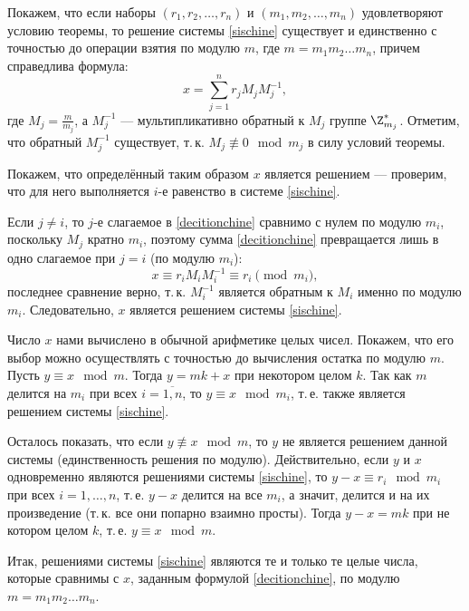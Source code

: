 \begin{enumerate}
Покажем, что если наборы $(r_{1},r_{2},\dots ,r_{n})$ и $(m_{1},m_{2},\dots ,m_{n})$ удовлетворяют условию теоремы, то решение системы \eqref{sischine} существует и единственно с точностью до операции взятия по модулю $m$, где $m=m_1m_2\dots m_n$, причем справедлива формула:
\begin{equation}\label{decitionchine}
x=\sum _{{j=1}}^{n}r_{j}M_{j}M_{j}^{{-1}},
\end{equation}
где $M_{j}=\frac m{m_{j}}$, а $M_{j}^{{-1}}$ --- мультипликативно обратный к $M_{j}$ группе $\Z_{m_j}^*$. Отметим, что обратный $M_j^{-1}$ существует, т.\,к. $M_j\not\equiv 0\mod m_j$ в силу условий теоремы.

Покажем, что определённый таким образом $x$ является решением --- проверим, что для него выполняется $i$-е равенство в системе \eqref{sischine}.

Если $j\ne i$, то $j$-е слагаемое в \eqref{decitionchine} сравнимо с нулем по модулю $m_i$, поскольку $M_j$ кратно $m_i$, поэтому сумма \eqref{decitionchine} превращается лишь в одно слагаемое при $j=i$ (по модулю $m_i$):
$$
x\equiv r_{i}M_{i}M_{i}^{{-1}}\equiv r_i\pmod m_i,
$$
последнее сравнение верно, т.\,к. $M_i^{-1}$ является обратным к $M_i$ именно по модулю $m_i$. Следовательно,
$x$ является решением системы \eqref{sischine}.

Число $x$ нами вычислено в обычной арифметике целых чисел. Покажем, что его выбор можно осуществлять с точностью до вычисления остатка по модулю $m$. Пусть $y\equiv x\mod m$. Тогда $y=mk+x$ при некотором целом $k$. Так как $m$ делится на $m_i$ при всех $i=\overline{1,n}$, то $y\equiv x\mod m_i$, т.\,е. также является решением системы \eqref{sischine}.

Осталось показать, что если $y\not\equiv x\mod m$, то $y$ не является решением данной системы (единственность решения по модулю). Действительно, если $y$ и $x$ одновременно являются решениями системы \eqref{sischine}, то $y-x \equiv r_i\mod m_i$ при всех $i=1,\dots,n$, т.\,е. $y-x$ делится на все $m_i$, а значит, делится и на их произведение (т.\,к. все они попарно взаимно просты). Тогда $y-x=mk$ при не котором целом $k$, т.\,е. $y\equiv x\mod m$.

Итак, решениями системы \eqref{sischine} являются те и только те целые числа, которые сравнимы с $x$, заданным формулой \eqref{decitionchine}, по модулю $m=m_1m_2\dots m_n$.
\epf





\end{enumerate}
